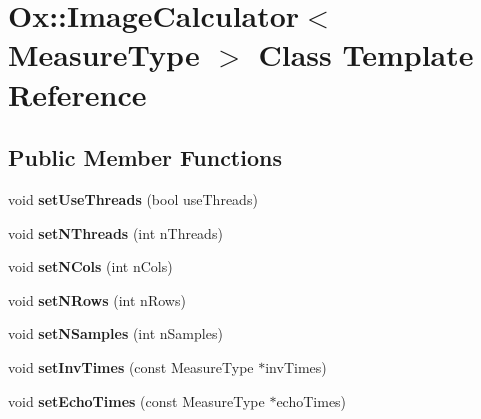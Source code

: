 \hypertarget{class_ox_1_1_image_calculator}{}\section{Ox\+:\+:Image\+Calculator$<$ Measure\+Type $>$ Class Template Reference}
\label{class_ox_1_1_image_calculator}
\subsection*{Public Member Functions}
\begin{DoxyCompactItemize}
\item 
void {\bfseries set\+Use\+Threads} (bool use\+Threads)\hypertarget{class_ox_1_1_image_calculator_ab004ca9b5e6c4b78a04ae6ca4646d46a}{}\label{class_ox_1_1_image_calculator_ab004ca9b5e6c4b78a04ae6ca4646d46a}

\item 
void {\bfseries set\+N\+Threads} (int n\+Threads)\hypertarget{class_ox_1_1_image_calculator_ab409d3f959d5b390a8b4ef598890e716}{}\label{class_ox_1_1_image_calculator_ab409d3f959d5b390a8b4ef598890e716}

\item 
void {\bfseries set\+N\+Cols} (int n\+Cols)\hypertarget{class_ox_1_1_image_calculator_a99a970fa021b150afa3a99b55a19a418}{}\label{class_ox_1_1_image_calculator_a99a970fa021b150afa3a99b55a19a418}

\item 
void {\bfseries set\+N\+Rows} (int n\+Rows)\hypertarget{class_ox_1_1_image_calculator_ae9df8ad7f01b10d9e9b3513a183f2637}{}\label{class_ox_1_1_image_calculator_ae9df8ad7f01b10d9e9b3513a183f2637}

\item 
void {\bfseries set\+N\+Samples} (int n\+Samples)\hypertarget{class_ox_1_1_image_calculator_a499275c9dcb2c37fa9b4658593b72eda}{}\label{class_ox_1_1_image_calculator_a499275c9dcb2c37fa9b4658593b72eda}

\item 
void {\bfseries set\+Inv\+Times} (const Measure\+Type $\ast$inv\+Times)\hypertarget{class_ox_1_1_image_calculator_a70298c63c87036f8c29d489144abf591}{}\label{class_ox_1_1_image_calculator_a70298c63c87036f8c29d489144abf591}

\item 
void {\bfseries set\+Echo\+Times} (const Measure\+Type $\ast$echo\+Times)\hypertarget{class_ox_1_1_image_calculator_ab546ca1c04b5c4ab79a20e02c7078e8d}{}\label{class_ox_1_1_image_calculator_ab546ca1c04b5c4ab79a20e02c7078e8d}


\end{DoxyCompactItemize}
